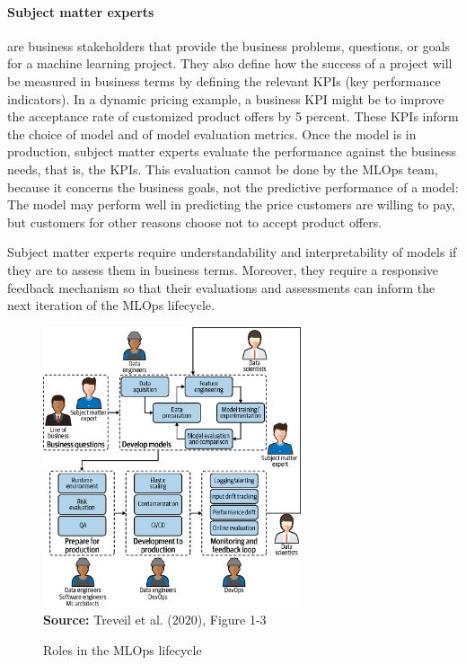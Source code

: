 \paragraph*{Subject matter experts} are business stakeholders that provide the business problems, questions, or goals for a machine learning project. They also define how the success of a project will be measured in business terms by defining the relevant KPIs (key performance indicators). In a dynamic pricing example, a business KPI might be to improve the acceptance rate of customized product offers by 5 percent. These KPIs inform the choice of model and of model evaluation metrics. Once the model is in production, subject matter experts evaluate the performance against the business needs, that is, the KPIs. This evaluation cannot be done by the MLOps team, because it concerns the business goals, not the predictive performance of a model: The model may perform well in predicting the price customers are willing to pay, but customers for other reasons choose not to accept product offers.

Subject matter experts require understandability and interpretability of models if they are to assess them in business terms. Moreover, they require a responsive feedback mechanism so that their evaluations and assessments can inform the next iteration of the MLOps lifecycle.

\begin{figure}
\centering
\includegraphics[height=3.25in]{imlo_0103.png} \\

\scriptsize \textbf{Source:} Treveil et al. (2020), Figure 1-3
\caption{Roles in the MLOps lifecycle}
\label{fig:mlopsroles}
\end{figure}

